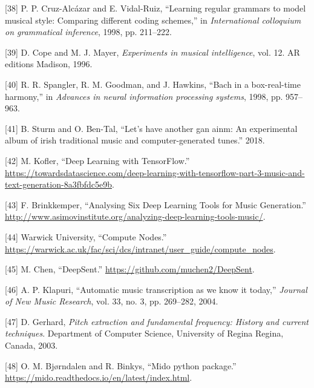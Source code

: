 \documentclass[12pt,]{article}
\begin{document}
\leavevmode\hypertarget{ref-cruz1998learning}{}%
{[}38{]} P. P. Cruz-Alcázar and E. Vidal-Ruiz, ``Learning regular
grammars to model musical style: Comparing different coding schemes,''
in \emph{International colloquium on grammatical inference}, 1998, pp.
211--222.

\leavevmode\hypertarget{ref-cope1996experiments}{}%
{[}39{]} D. Cope and M. J. Mayer, \emph{Experiments in musical
intelligence}, vol. 12. AR editions Madison, 1996.

\leavevmode\hypertarget{ref-spangler1998bach}{}%
{[}40{]} R. R. Spangler, R. M. Goodman, and J. Hawkins, ``Bach in a
box-real-time harmony,'' in \emph{Advances in neural information
processing systems}, 1998, pp. 957--963.

\leavevmode\hypertarget{ref-sturm2018let}{}%
{[}41{]} B. Sturm and O. Ben-Tal, ``Let's have another gan ainm: An
experimental album of irish traditional music and computer-generated
tunes.'' 2018.

\leavevmode\hypertarget{ref-mkofler}{}%
{[}42{]} M. Kofler, ``Deep Learning with TensorFlow.'' \\
\url{https://towardsdatascience.com/deep-learning-with-tensorflow-part-3-music-and-text-generation-8a3fbfdc5e9b}.

\leavevmode\hypertarget{ref-asimovinst}{}%
{[}43{]} F. Brinkkemper, ``Analysing Six Deep Learning Tools for Music
Generation.'' \\
\url{http://www.asimovinstitute.org/analyzing-deep-learning-tools-music/}.

\leavevmode\hypertarget{ref-warwickcomputenodes}{}%
{[}44{]} \relax Warwick University, ``Compute Nodes.'' \\
\url{https://warwick.ac.uk/fac/sci/dcs/intranet/user_guide/compute_nodes}.

\leavevmode\hypertarget{ref-deepsent}{}%
{[}45{]} M. Chen, ``DeepSent.''
\url{https://github.com/muchen2/DeepSent}.

\leavevmode\hypertarget{ref-klapuri2004automatic}{}%
{[}46{]} A. P. Klapuri, ``Automatic music transcription as we know it
today,'' \emph{Journal of New Music Research}, vol. 33, no. 3, pp.
269--282, 2004.

\leavevmode\hypertarget{ref-gerhard2003pitch}{}%
{[}47{]} D. Gerhard, \emph{Pitch extraction and fundamental frequency:
History and current techniques}. Department of Computer Science,
University of Regina Regina, Canada, 2003.

\leavevmode\hypertarget{ref-mido}{}%
{[}48{]} O. M. Bjørndalen and R. Binkys, ``Mido python package.'' \\
\url{https://mido.readthedocs.io/en/latest/index.html}.
\end{document}
